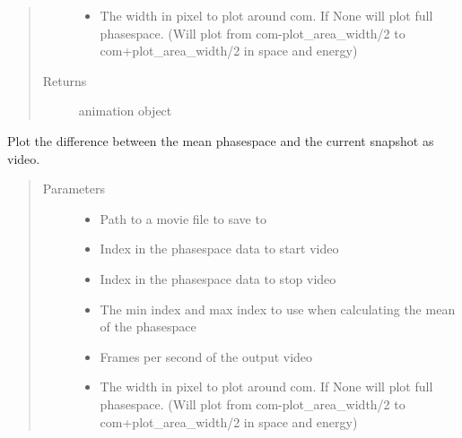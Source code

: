 \documentclass[letterpaper,10pt,openany,oneside,english]{sphinxmanual}
\begin{document}
\begin{fulllineitems}
\begin{fulllineitems}
\begin{quote}
\begin{description}
\begin{itemize}
\item {} 
 \textendash{} The width in pixel to plot around com. If None will plot full phasespace.  
(Will plot from com-plot\_area\_width/2 to com+plot\_area\_width/2 in space and energy)

\end{itemize}

\item[{Returns}] \leavevmode
animation object

\end{description}\end{quote}

\end{fulllineitems}


\begin{fulllineitems}
\label{\detokenize{plots:plots.PhaseSpace.microstructure_movie}}
Plot the difference between the mean phasespace and the current snapshot as video.
\begin{quote}\begin{description}
\item[{Parameters}] \leavevmode\begin{itemize}
\item {} 
 \textendash{} Path to a movie file to save to

\item {} 
 \textendash{} Index in the phasespace data to start video

\item {} 
 \textendash{} Index in the phasespace data to stop video

\item {} 
 \textendash{} The min index and max index to use when calculating the mean of the phasespace

\item {} 
 \textendash{} Frames per second of the output video

\item {} 
 \textendash{} The width in pixel to plot around com. If None will plot full phasespace.  
(Will plot from com-plot\_area\_width/2 to com+plot\_area\_width/2 in space and energy)


\end{itemize}
\end{description}
\end{quote}
\end{fulllineitems}
\end{fulllineitems}
\end{document}
